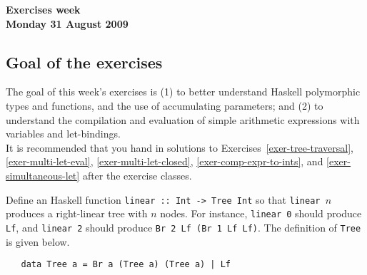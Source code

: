 \documentclass[a4paper]{article}
\begin{document}
\begin{center}
{\Large\bf Exercises week \\[1ex]
Monday 31 August 2009}\\[1ex]
\end{center}

\subsection*{Goal of the exercises}

The goal of this week's exercises is (1) to better understand Haskell
polymorphic types and functions, and the use of accumulating
parameters; and (2) to understand the compilation and evaluation of
simple arithmetic expressions with variables and let-bindings.\\


\noindent 
It is recommended that you hand in solutions to
Exercises~\ref{exer-tree-traversal}, \ref{exer-multi-let-eval},
\ref{exer-multi-let-closed}, \ref{exer-comp-expr-to-ints}, and
\ref{exer-simultaneous-let} after the exercise classes.  \\


\begin{exercise}\label{exer-right-linear} {\color{red}{This exercise isn't in the book, but I've translated the questions and the answers anyway.}}
  Define an Haskell function \texttt{linear ::\ Int -> Tree Int} so that
  \texttt{linear $n$} produces a right-linear tree with $n$ nodes.
  For instance, \texttt{linear 0} should produce \texttt{Lf}, and
  \texttt{linear 2} should produce \texttt{Br 2 Lf (Br 1 Lf Lf)}. The definition
  of \texttt{Tree} is given below.
{\codesetup\begin{verbatim}
   data Tree a = Br a (Tree a) (Tree a) | Lf
\end{verbatim}}

\end{exercise}
\end{document}
